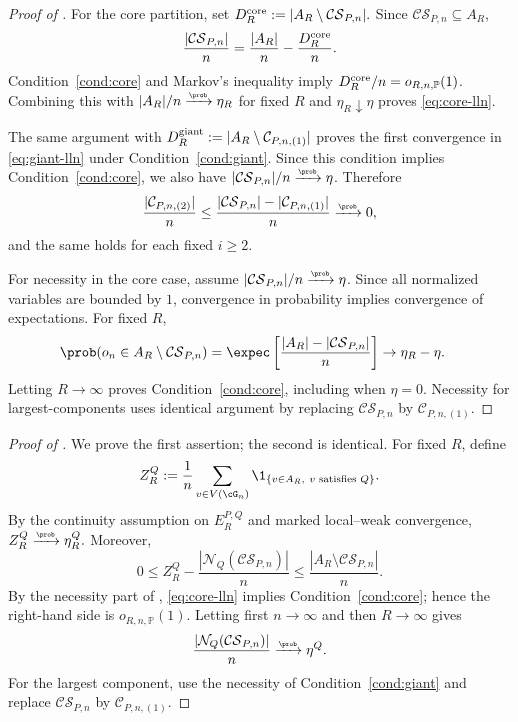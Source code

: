 \documentclass[11pt]{article}
\theoremstyle{plain}
\begin{document}


\begin{proof}[Proof of ]
For the core partition, set
\(
D_R^{\rm core}:=|A_R\setminus\mathcal{CS}_{P,n}|.
\)
Since $\mathcal{CS}_{P,n}\subseteq A_R$,
\[
\frac{|\mathcal{CS}_{P,n}|}{n}
=\frac{|A_R|}{n}-\frac{D_R^{\rm core}}n.
\]
Condition~\ref{cond:core} and Markov's inequality imply
$D_R^{\rm core}/n=o_{R,n,\mathbb P}(1)$. Combining this with
$|A_R|/n\xrightarrow{\scriptscriptstyle\prob}\eta_R$ for fixed $R$ and
$\eta_R\downarrow\eta$ proves \eqref{eq:core-lln}.

The same argument with
\(
D_R^{\rm giant}:=|A_R\setminus\mathcal C_{P,n,(1)}|
\)
proves the first convergence in \eqref{eq:giant-lln} under
Condition~\ref{cond:giant}. Since this condition implies
Condition~\ref{cond:core}, we also have
$|\mathcal{CS}_{P,n}|/n\xrightarrow{\scriptscriptstyle\prob}\eta$. Therefore
\[
\frac{|\mathcal C_{P,n,(2)}|}{n}
\le
\frac{|\mathcal{CS}_{P,n}|-|\mathcal C_{P,n,(1)}|}{n}
\xrightarrow{\scriptscriptstyle\prob}0,
\]
and the same holds for each fixed $i\ge2$.

For necessity in the core case, assume
$|\mathcal{CS}_{P,n}|/n\xrightarrow{\scriptscriptstyle\prob}\eta$. Since all
normalized variables are bounded by $1$, convergence in probability implies
convergence of expectations. For fixed $R$,
\[
\begin{aligned}
\prob(o_n\in A_R\setminus\mathcal{CS}_{P,n})
&=\expec\left[\frac{|A_R|-|\mathcal{CS}_{P,n}|}{n}\right]\to \eta_R-\eta.
\end{aligned}
\]
Letting $R\to\infty$ proves Condition~\ref{cond:core}, including when
$\eta=0$. Necessity for largest-components uses identical argument by replacing
$\mathcal{CS}_{P,n}$ by $\mathcal C_{P,n,(1)}$.
\end{proof}


\begin{proof}[Proof of ]
We prove the first assertion; the second is identical. For fixed $R$, define
\[
Z_R^Q:=\frac1n\sum_{v\in V(\cG_n)}
\1_{\{v\in A_R,\ v\text{ satisfies }Q\}}.
\]
By the continuity assumption on $E_R^{P,Q}$ and marked local--weak convergence,
\(Z_R^Q\xrightarrow{\scriptscriptstyle\prob}\eta_R^Q.
\)
Moreover,
\[
0\le Z_R^Q-
\frac{|\mathcal N_Q(\mathcal{CS}_{P,n})|}{n}
\le
\frac{|A_R\setminus\mathcal{CS}_{P,n}|}{n}.
\]
By the necessity part of , \eqref{eq:core-lln} implies
Condition~\ref{cond:core}; hence the right-hand side is
$o_{R,n,\mathbb P}(1)$. Letting first $n\to\infty$ and then $R\to\infty$
gives
\[
\frac{|\mathcal N_Q(\mathcal{CS}_{P,n})|}{n}
\xrightarrow{\scriptscriptstyle\prob}\eta^Q.
\]
For the largest component, use the necessity of Condition~\ref{cond:giant} and
replace $\mathcal{CS}_{P,n}$ by $\mathcal C_{P,n,(1)}$.
\end{proof}


\begingroup
\small
{}


\endgroup
\end{document}
